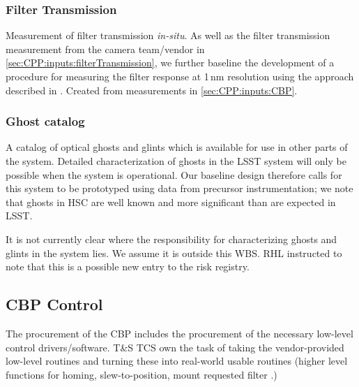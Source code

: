 \subsubsection{Filter Transmission}\label{sec:CPP:output:filterTransmission}
Measurement of filter transmission \emph{in-situ}. As well as the filter transmission measurement from the camera team/vendor in \secsymbol\ref{sec:CPP:inputs:filterTransmission}, we further baseline the development of a procedure for measuring the filter response at 1\,nm resolution using the approach described in \cite{Lupton15}.
\alg Created from measurements in \secsymbol\ref{sec:CPP:inputs:CBP}. 


\subsubsection{Ghost catalog}\label{sec:CPP:output:GhostCatalog}
A catalog of optical ghosts and glints which is available for use in other parts of the system. Detailed characterization of ghosts in the LSST system will only be possible when the system is operational. Our baseline design therefore calls for this system to be prototyped using data from precursor instrumentation; we note that ghosts in \eg HSC are well known and more significant than are expected in LSST.
\begin{note}
It is not currently clear where the responsibility for characterizing ghosts and glints in the system lies. We assume it is outside this WBS. RHL instructed to note that this is a possible new entry to the risk registry.
\end{note}





\subsection{CBP Control}\label{sec:CPP:CBP_control}
The procurement of the CBP includes the procurement of the necessary low-level control drivers/software. T\&S TCS own the task of taking the vendor-provided low-level routines and turning these into real-world usable routines (higher level functions for \eg homing, slew-to-position, mount requested filter \etc.)

